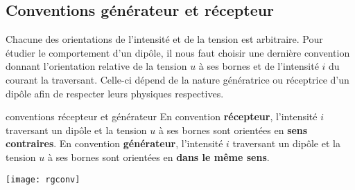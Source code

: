\documentclass[../main/main.tex]{subfiles}
\begin{document}
\subsection{Conventions générateur et récepteur}
Chacune des orientations de l'intensité et de la tension est arbitraire. Pour
étudier le comportement d'un dipôle, il nous faut choisir une dernière
convention donnant l'orientation relative de la tension $u$ à ses bornes et de
l'intensité $i$ du courant la traversant. Celle-ci dépend de la nature
génératrice ou réceptrice d'un dipôle afin de respecter leurs physiques
respectives.


% 

\begin{defi}[label=def:convrg, sidebyside, righthand width=.3\linewidth]
    {conventions récepteur et générateur}
    En convention \textbf{récepteur}, l'intensité $i$ traversant un dipôle et la
    tension $u$ à ses bornes sont orientées en \textbf{sens contraires}.
    \bigbreak
    En convention \textbf{générateur}, l'intensité $i$ traversant un dipôle et la
    tension $u$ à ses bornes sont orientées en \textbf{dans le même sens}.
    \tcblower
    \begin{center}
        \texttt{[image: rgconv]}
    \end{center}
\end{defi}
\end{document}

